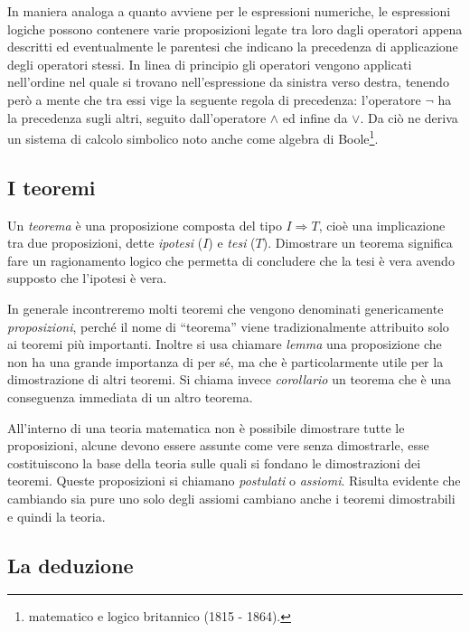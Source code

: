 In maniera analoga a quanto avviene per le espressioni numeriche, le espressioni logiche possono contenere varie proposizioni legate tra loro dagli operatori appena descritti ed eventualmente le parentesi che indicano la precedenza di applicazione degli operatori stessi. In linea di principio gli operatori vengono applicati nell'ordine nel quale si trovano nell'espressione da sinistra verso destra, tenendo però a mente che tra essi vige la seguente regola di precedenza: l'operatore $\neg$ ha la precedenza sugli altri, seguito dall'operatore $\wedge$ ed infine da $\vee$. Da ciò ne deriva un sistema di calcolo simbolico noto anche come algebra di Boole\footnote{matematico e logico britannico (1815 - 1864).}.

\vspazio\ovalbox{\risolvii \ref{ese:6.12}, \ref{ese:6.13}, \ref{ese:6.14}, \ref{ese:6.15}}

\subsection{I teoremi}

Un \emph{teorema} è una proposizione composta del tipo $I\Rightarrow T$, cioè una implicazione tra due proposizioni, dette \emph{ipotesi} ($I$) e \emph{tesi} ($T$). Dimostrare un teorema significa fare un ragionamento logico che permetta di concludere che la tesi è vera avendo supposto che l'ipotesi è vera.

In generale incontreremo molti teoremi che vengono denominati genericamente \emph{proposizioni}, perché il nome di ``teorema'' viene tradizionalmente attribuito solo ai teoremi più importanti. Inoltre si usa chiamare \emph{lemma} una proposizione che non ha una grande importanza di per sé, ma che è particolarmente utile per la dimostrazione di altri teoremi. Si chiama invece \emph{corollario} un teorema che è una conseguenza immediata di un altro teorema.

All'interno di una teoria matematica non è possibile dimostrare tutte le proposizioni, alcune devono essere assunte come vere senza dimostrarle, esse costituiscono la base della teoria sulle quali si fondano le dimostrazioni dei teoremi. Queste proposizioni si chiamano \emph{postulati} o \emph{assiomi}. Risulta evidente che cambiando sia pure uno solo degli assiomi cambiano anche i teoremi dimostrabili e quindi la teoria.


\subsection{La deduzione}

